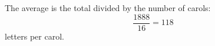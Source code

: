 The average is the total divided by the number of carols:
\[
\dfrac{1888}{16}=\boxed{118}
\]
letters per carol.
